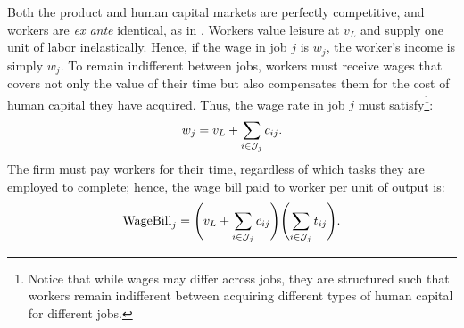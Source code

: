\documentclass{article}
\theoremstyle{plain}
\theoremstyle{plain}
\begin{document}
Both the product and human capital markets are perfectly competitive, and workers are \emph{ex ante} identical, as in \cite{becker1992division}.
Workers value leisure at $v_L$ and supply one unit of labor inelastically.
Hence, if the wage in job $j$ is $w_j$, the worker's income is simply $w_j$.
To remain indifferent between jobs, workers must receive wages that covers not only the value of their time but also compensates them for the cost of human capital they have acquired.
Thus, the wage rate in job $j$ must satisfy\footnote{Notice that while wages may differ across jobs, they are structured such that workers remain indifferent between acquiring different types of human capital for different jobs.}:
\begin{align}
\label{eq:wage}
w_j = v_L + \sum_{i \in \mathcal{J}_j} c_{ij}.
\end{align}
The firm must pay workers for their time, regardless of which tasks they are employed to complete; hence, the wage bill paid to worker per unit of output is:
\begin{align}
\label{eq:wagebill}
\text{WageBill}_j = \Biggl(v_L + \sum_{i \in \mathcal{J}_j} c_{ij} \Biggr) \Biggl(\sum_{i \in \mathcal{J}_j} t_{ij} \Biggr).
\end{align}
\end{document}
